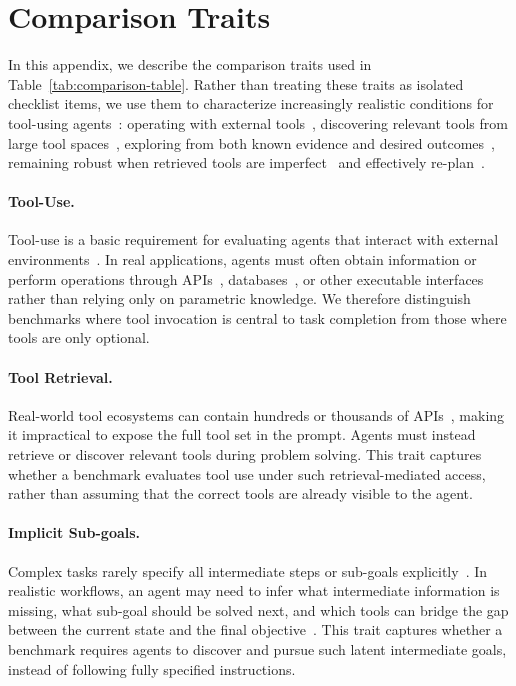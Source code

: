 \documentclass{llmxive}
\begin{document}
\section{Comparison Traits}
\label{app:comparison-traits}


In this appendix, we describe the comparison traits used in Table~\ref{tab:comparison-table}. 
Rather than treating these traits as isolated checklist items, we use them to characterize increasingly realistic conditions for tool-using agents~\citep{yao2024taubench}: operating with external tools~\citep{ToolOrchestra,xRouter}, discovering relevant tools from large tool spaces~\citep{APIBench,ToolBench, ToolRet}, exploring from both known evidence and desired outcomes~\citep{NAACL,EscapeBench}, remaining robust when retrieved tools are imperfect~\citep{ToolGym} and effectively re-plan~\citep{shen2023taskbench, CostBench,AdaPlanBench}.

\paragraph{Tool-Use.}
Tool-use is a basic requirement for evaluating agents that interact with external environments~\citep{ToolRL}.
In real applications, agents must often obtain information or perform operations through APIs~\citep{APIBench}, databases~\citep{LiveAPIBench}, or other executable interfaces~\citep{SWEAgent} rather than relying only on parametric knowledge.
We therefore distinguish benchmarks where tool invocation is central to task completion from those where tools are only optional.

\paragraph{Tool Retrieval.}
Real-world tool ecosystems can contain hundreds or thousands of APIs~\citep{ToolLLM, LiveAPIBench, liu-etal-2024-gprooft}, making it impractical to expose the full tool set in the prompt. 
Agents must instead retrieve or discover relevant tools during problem solving. 
This trait captures whether a benchmark evaluates tool use under such retrieval-mediated access, rather than assuming that the correct tools are already visible to the agent.

\paragraph{Implicit Sub-goals.}
Complex tasks rarely specify all intermediate steps or sub-goals explicitly~\citep{EscapeBench}. 
In realistic workflows, an agent may need to infer what intermediate information is missing, what sub-goal should be solved next, and which tools can bridge the gap between the current state and the final objective~\citep{PlanAndSolve}. 
This trait captures whether a benchmark requires agents to discover and pursue such latent intermediate goals, instead of following fully specified instructions.
\end{document}
